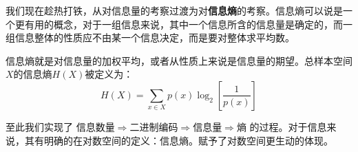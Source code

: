 \documentclass[fontset=none]{ctexart}
\begin{document}
我们现在趁热打铁，从对信息量的考察过渡为对\textbf{信息熵}的考察。信息熵可以说是一个更有用的概念，对于一组信息来说，其中一个信息所含的信息量是确定的，而一组信息整体的性质应不由某一个信息决定，而是要对整体求平均数。

信息熵就是对信息量的加权平均，或者从性质上来说是信息量的期望。总样本空间$X$的信息熵$H(X)$被定义为：$$H\left( X \right) =\sum_{x\in X}{p\left( x \right)}\log _2\left[ \frac{1}{p\left( x \right)} \right] $$

至此我们实现了  $\text{信息数量}\Rightarrow \text{二进制编码}\Rightarrow \text{信息量}\Rightarrow \text{熵}$  的过程。对于信息来说，其有明确的在对数空间的定义：信息熵。赋予了对数空间更生动的体现。



















\kaishu
\end{document}
